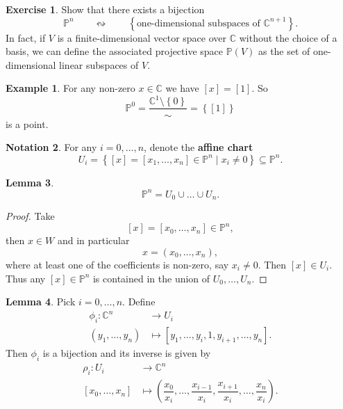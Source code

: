 \documentclass{article}
\newcommand{\C}{\mathbb{C}}
\renewcommand{\P}{\mathbb{P}}
\newcommand{\rb}[1]{\left( #1 \right)}
\renewcommand{\sb}[1]{\left[ #1 \right]}
\newcommand{\cb}[1]{\left\{ #1 \right\}}
\theoremstyle{definition}\newtheorem{definition}{Definition}[section]
\theoremstyle{definition}\newtheorem{notation}[definition]{Notation}
\theoremstyle{definition}\newtheorem{remark}[definition]{Remark}
\theoremstyle{definition}\newtheorem{example1}[definition]{Example}
\theoremstyle{definition}\newtheorem{fact}{Fact}
\theoremstyle{definition}\newtheorem{exercise}{Exercise}
\theoremstyle{definition}\newtheorem*{example2}{Example}
\newtheorem{lemma}[definition]{Lemma}
\begin{document}
\begin{exercise}
Show that there exists a bijection
$$ \P^n \qquad \leftrightsquigarrow \qquad \cb{\text{one-dimensional subspaces of } \C^{n + 1}}. $$
In fact, if $ V $ is a finite-dimensional vector space over $ \C $ without the choice of a basis, we can define the associated projective space $ \P\rb{V} $ as the set of one-dimensional linear subspaces of $ V $.
\end{exercise}

\begin{example1}
For any non-zero $ x \in \C $ we have $ \sb{x} = \sb{1} $. So
$$ \P^0 = \dfrac{\C^1 \setminus \cb{0}}{\sim} = \cb{\sb{1}} $$
is a point.
\end{example1}

\begin{notation}
For any $ i = 0, \dots, n $, denote the \textbf{affine chart}
$$ U_i = \cb{\sb{x} = \sb{x_1, \dots, x_n} \in \P^n \mid x_i \ne 0} \subseteq \P^n. $$
\end{notation}

\begin{lemma}
\label{lem:3.9}
$$ \P^n = U_0 \cup \dots \cup U_n. $$
\end{lemma}

\begin{proof}
Take
$$ \sb{x} = \sb{x_0, \dots, x_n} \in \P^n, $$
then $ x \in W $ and in particular
$$ x = \rb{x_0, \dots, x_n}, $$
where at least one of the coefficients is non-zero, say $ x_i \ne 0 $. Then $ \sb{x} \in U_i $. Thus any $ \sb{x} \in \P^n $ is contained in the union of $ U_0, \dots, U_n $.
\end{proof}

\begin{lemma}
\label{lem:3.10}
Pick $ i = 0, \dots, n $. Define
\begin{align*}
\phi_i : \C^n & \to U_i \\
\rb{y_1, \dots, y_n} & \mapsto \sb{y_1, \dots, y_i, 1, y_{i + 1}, \dots, y_n}.
\end{align*}
Then $ \phi_i $ is a bijection and its inverse is given by
\begin{align*}
\rho_i : U_i & \to \C^n \\
\sb{x_0, \dots, x_n} & \mapsto \rb{\dfrac{x_0}{x_i}, \dots, \dfrac{x_{i - 1}}{x_i}, \dfrac{x_{i + 1}}{x_i}, \dots, \dfrac{x_n}{x_i}}.
\end{align*}
\end{lemma}
\end{document}
